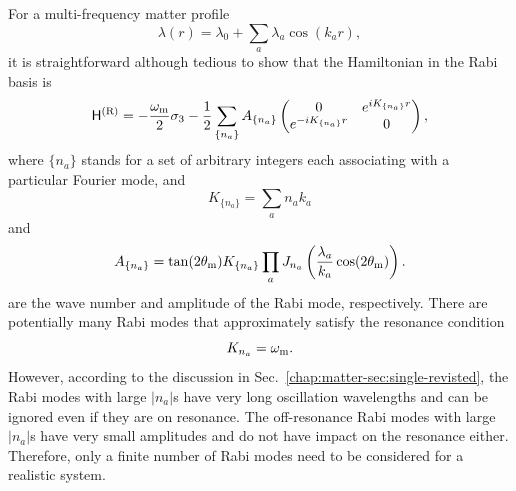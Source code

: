 For a multi-frequency matter profile 
\begin{equation}
    \lambda(r) = \lambda_0 + \sum_a \lambda_a \cos (k_a r),
\end{equation}
it is straightforward although tedious to show that the Hamiltonian in the Rabi basis is 
\begin{equation}
    \mathsf H^{(\mathrm R)} = - \frac{\omega_\mathrm m}{2} \sigma_3 - \frac{1}{2} \sum_{ \{n_a\} } A_{ \{n_a\} } 
    \begin{pmatrix}
    0 &   e^{ i K_{\{n_a\}} r }\\
    e^{ -i K_{\{n_a\}} r}  & 0 
    \end{pmatrix},
\end{equation}
where $\{n_a\}$ stands for a set of arbitrary integers each associating with a particular Fourier mode, and
\begin{equation}
    K_{\{n_a\}} = \sum_{a} n_a k_a
\end{equation}
and
\begin{equation}
    A_{\{n_a\}} = \tan(2\theta_\mathrm m) K_{\{n_a\}} \prod_{a} J_{n_a} \left( \frac{\lambda_{a}}{ k_{a} } \cos(2\theta_\mathrm m) \right).
\end{equation}
are the wave number and amplitude of the Rabi mode, respectively. There are potentially many Rabi modes that approximately satisfy the resonance condition
\begin{equation}
    K_{n_a} = \omega_\mathrm m .
\end{equation}
However, according to the discussion in Sec.~\ref{chap:matter-sec:single-revisted}, the Rabi modes with large $\vert n_a\vert$s have very long oscillation wavelengths and can be ignored even if they are on resonance. The off-resonance Rabi modes with large $\vert n_a\vert$s have very small amplitudes and do not have impact on the resonance either. Therefore, only a finite number of Rabi modes need to be considered for a realistic system.
